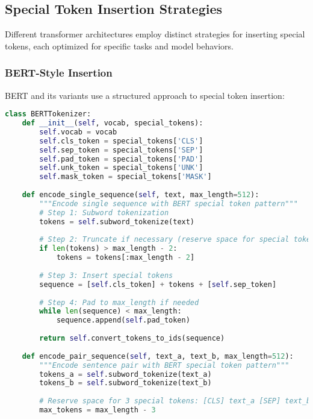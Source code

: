 \subsection{Special Token Insertion Strategies}

Different transformer architectures employ distinct strategies for inserting special tokens, each optimized for specific tasks and model behaviors.

\subsubsection{BERT-Style Insertion}

BERT and its variants use a structured approach to special token insertion:

\begin{lstlisting}[language=Python, caption=BERT-style special token insertion]
class BERTTokenizer:
    def __init__(self, vocab, special_tokens):
        self.vocab = vocab
        self.cls_token = special_tokens['CLS']
        self.sep_token = special_tokens['SEP']
        self.pad_token = special_tokens['PAD']
        self.unk_token = special_tokens['UNK']
        self.mask_token = special_tokens['MASK']
        
    def encode_single_sequence(self, text, max_length=512):
        """Encode single sequence with BERT special token pattern"""
        # Step 1: Subword tokenization
        tokens = self.subword_tokenize(text)
        
        # Step 2: Truncate if necessary (reserve space for special tokens)
        if len(tokens) > max_length - 2:
            tokens = tokens[:max_length - 2]
        
        # Step 3: Insert special tokens
        sequence = [self.cls_token] + tokens + [self.sep_token]
        
        # Step 4: Pad to max_length if needed
        while len(sequence) < max_length:
            sequence.append(self.pad_token)
            
        return self.convert_tokens_to_ids(sequence)
    
    def encode_pair_sequence(self, text_a, text_b, max_length=512):
        """Encode sentence pair with BERT special token pattern"""
        tokens_a = self.subword_tokenize(text_a)
        tokens_b = self.subword_tokenize(text_b)
        
        # Reserve space for 3 special tokens: [CLS] text_a [SEP] text_b [SEP]
        max_tokens = max_length - 3
        

\end{lstlisting}
